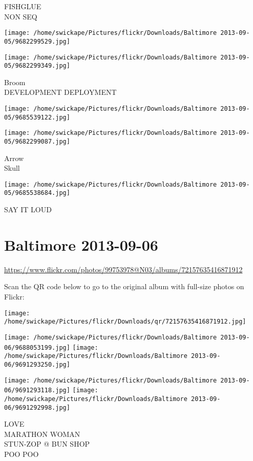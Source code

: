 \documentclass[10pt,letterpaper]{article}
\begin{document}
FISHGLUE\\
NON SEQ
\pagebreak

\texttt{[image: /home/swickape/Pictures/flickr/Downloads/Baltimore 2013-09-05/9682299529.jpg]}

\vspace{0.25in}
\texttt{[image: /home/swickape/Pictures/flickr/Downloads/Baltimore 2013-09-05/9682299349.jpg]}

Broom\\
DEVELOPMENT DEPLOYMENT
\pagebreak

\texttt{[image: /home/swickape/Pictures/flickr/Downloads/Baltimore 2013-09-05/9685539122.jpg]}

\vspace{0.25in}
\texttt{[image: /home/swickape/Pictures/flickr/Downloads/Baltimore 2013-09-05/9682299087.jpg]}

Arrow\\
Skull
\pagebreak

\texttt{[image: /home/swickape/Pictures/flickr/Downloads/Baltimore 2013-09-05/9685538684.jpg]}

SAY IT LOUD
\pagebreak

\section*{Baltimore 2013-09-06}

\url{https://www.flickr.com/photos/99753978@N03/albums/72157635416871912}

Scan the QR code below to go to the original album with full-size photos on Flickr:

\texttt{[image: /home/swickape/Pictures/flickr/Downloads/qr/72157635416871912.jpg]}
\pagebreak

\texttt{[image: /home/swickape/Pictures/flickr/Downloads/Baltimore 2013-09-06/9688053199.jpg]}
\texttt{[image: /home/swickape/Pictures/flickr/Downloads/Baltimore 2013-09-06/9691293250.jpg]}

\texttt{[image: /home/swickape/Pictures/flickr/Downloads/Baltimore 2013-09-06/9691293118.jpg]}
\texttt{[image: /home/swickape/Pictures/flickr/Downloads/Baltimore 2013-09-06/9691292998.jpg]}

LOVE\\
MARATHON WOMAN\\
STUN{-}ZOP @ BUN SHOP\\
POO POO
\pagebreak
\end{document}

